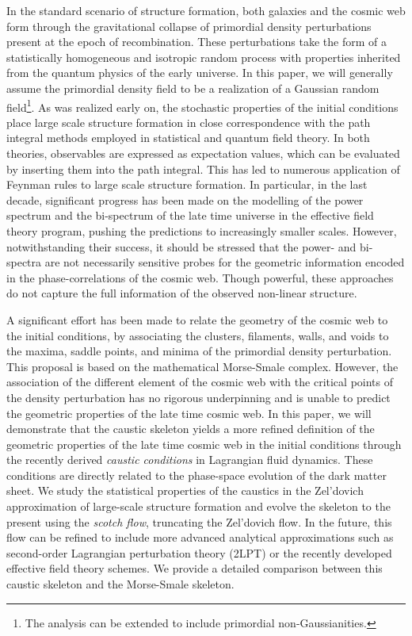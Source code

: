 \documentclass[a4paper, 11pt]{article}
\begin{document}
In the standard scenario of structure formation, both galaxies and the cosmic web form through the gravitational collapse of primordial density perturbations present at the epoch of recombination. These perturbations take the form of a statistically homogeneous and isotropic random process with properties inherited from the quantum physics of the early universe. In this paper, we will generally assume the primordial density field to be a realization of a Gaussian random field\footnote{The analysis can be extended to include primordial non-Gaussianities.}. As was realized early on, the stochastic properties of the initial conditions place large scale structure formation in close correspondence with the path integral methods employed in statistical and quantum field theory. In both theories, observables are expressed as expectation values, which can be evaluated by inserting them into the path integral. This has led to numerous application of Feynman rules to large scale structure formation. In particular, in the last decade, significant progress has been made on the modelling of the power spectrum and the bi-spectrum of the late time universe in the effective field theory program, pushing the predictions to increasingly smaller scales. However, notwithstanding their success, it should be stressed that the power- and bi-spectra are not necessarily sensitive probes for the geometric information encoded in the phase-correlations of the cosmic web. Though powerful, these approaches do not capture the full information of the observed non-linear structure. 

A significant effort has been made to relate the geometry of the cosmic web to the initial conditions, by associating the clusters, filaments, walls, and voids to the maxima, saddle points, and minima of the primordial density perturbation. This proposal is based on the mathematical Morse-Smale complex. However, the association of the different element of the cosmic web with the critical points of the density perturbation has no rigorous underpinning and is unable to predict the geometric properties of the late time cosmic web. In this paper, we will demonstrate that the caustic skeleton yields a more refined definition of the geometric properties of the late time cosmic web in the initial conditions through the recently derived \textit{caustic conditions} in Lagrangian fluid dynamics. These conditions are directly related to the phase-space evolution of the dark matter sheet. We study the statistical properties of the caustics in the Zel'dovich approximation of large-scale structure formation and evolve the skeleton to the present using the \textit{scotch flow}, truncating the Zel'dovich flow. In the future, this flow can be refined to include more advanced analytical approximations such as second-order Lagrangian perturbation theory (2LPT) or the recently developed effective field theory schemes. We provide a detailed comparison between this caustic skeleton and the Morse-Smale skeleton.
\end{document}
